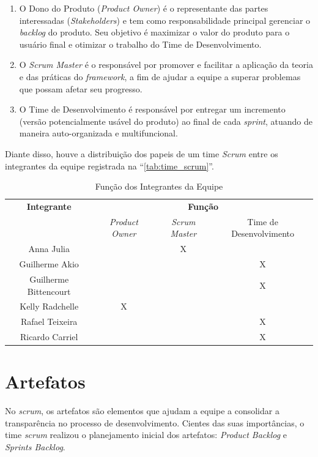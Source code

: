 \documentclass[
	12pt,				%
	openany,			%
	twoside,			%
	a4paper,			%
	english,			%
	french,				%
	spanish,			%
	brazil				%
	]{abntex2}
\begin{document}
\begin{enumerate}[label=\roman*)]
	\item O Dono do Produto (\textit{Product Owner}) é o representante das partes interessadas (\textit{Stakeholders}) e tem como responsabilidade principal gerenciar o \textit{backlog} do produto. Seu objetivo é maximizar o valor do produto para o usuário final e otimizar o trabalho do Time de Desenvolvimento. 
	\item O \textit{Scrum Master}  é o responsável por promover e facilitar a aplicação da teoria e das práticas do \textit{framework}, a fim de ajudar a equipe a superar problemas que possam afetar seu progresso. 
	\item O Time de Desenvolvimento é responsável por entregar um incremento (versão potencialmente usável do produto) ao final de cada \textit{sprint}, atuando de maneira auto-organizada e multifuncional.
\end{enumerate}
 
Diante disso, houve a distribuição dos papeis de um time \textit{Scrum} entre os integrantes da equipe registrada na “\autoref{tab:time_scrum}”.
%
\begin{table}[htb]
	\centering
	\caption{Função dos Integrantes da Equipe}
	\label{tab:time_scrum}
	\begin{tabular}{|c|c|c|c|}
		\hline
		\textbf{Integrante} & \multicolumn{3}{c|}{\textbf{Função}} \\ \cline{2-4}
		& \textit{Product Owner} & \textit{Scrum Master} & Time de Desenvolvimento \\ \hline
		Anna Julia &  & X & \\ \hline
		Guilherme Akio & & & X \\ \hline
		Guilherme Bittencourt & & & X \\ \hline
		Kelly Radchelle & X & & \\ \hline
		Rafael Teixeira & & & X \\ \hline
		Ricardo Carriel & & & X \\ \hline
	\end{tabular}
\end{table}

\section{Artefatos}
No \textit {scrum},  os artefatos são elementos que ajudam a equipe a consolidar a transparência no processo de desenvolvimento. Cientes das suas importâncias, o time \textit {scrum} realizou o planejamento inicial dos artefatos:  \textit {Product Backlog} e \textit {Sprints Backlog}.
%
\end{document}
